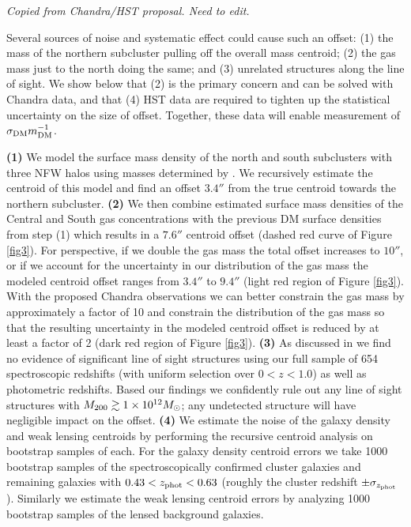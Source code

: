 \textit{Copied from Chandra/HST proposal. Need to edit.}

Several sources of noise and systematic effect could cause such an offset:
(1) the mass of the northern subcluster pulling off the overall mass
centroid; (2) the gas mass just to the north doing the same; and (3)
unrelated structures along the line of sight. We show below that (2)
is the primary concern and can be solved with Chandra data, and that
(4) HST data are required to tighten up the statistical uncertainty on
the size of offset.  Together, these data will enable measurement of
$\sigma_{\rm DM}m_{\rm DM}^{-1}$.

\textbf{(1)} We model the surface mass density of the north and south subclusters with three NFW halos using masses determined by \citet{Dawson:2012dl}. We recursively estimate the centroid of this model and find an offset $3.4''$ from the true centroid towards the northern subcluster. 
\textbf{(2)} We then combine estimated surface mass densities of the
Central and South gas concentrations with the previous DM surface
densities from step (1) which results in a $7.6''$ centroid offset (dashed red curve of Figure \ref{fig3}).  
For perspective, if we double the gas mass the total offset increases to $10''$, or if we account for the uncertainty in our distribution of the gas mass the modeled centroid offset ranges from $3.4''$ to $9.4''$ (light red region of Figure \ref{fig3}). 
With the proposed Chandra observations we can better constrain the gas mass by approximately a factor of 10 and constrain the distribution of the gas mass so that the resulting uncertainty in the modeled centroid offset is reduced by at least a factor of 2 (dark red region of Figure \ref{fig3}).
\textbf{(3)} As discussed in \citet{Dawson:2012dl} we find no evidence of significant line of sight structures using our full sample of 654 spectroscopic redshifts (with uniform selection over $0<z<1.0$) as well as photometric redshifts. 
Based our findings we confidently rule out any line of sight structures with $M_{\rm 200}\gtrsim1\times10^{12} M_\odot$; any undetected structure will have negligible impact on the offset.
\textbf{(4)} We estimate the noise of the galaxy density and weak lensing centroids by performing the recursive centroid analysis on bootstrap samples of each.
For the galaxy density centroid errors we take 1000 bootstrap samples of the spectroscopically confirmed cluster galaxies and remaining galaxies with $0.43<z_{\rm phot}<0.63$ (roughly the cluster redshift $\pm\sigma_{z_{\rm phot}}$).
Similarly we estimate the weak lensing centroid errors by analyzing 1000 bootstrap samples of the lensed background galaxies.

